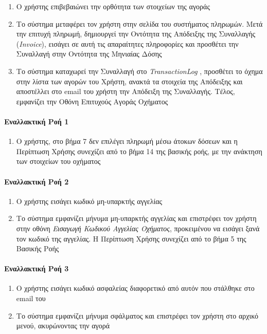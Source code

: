 \documentclass{../ol-softwaremanual}
\begin{document}
\begin{enumerate}
		\item Ο χρήστης επιβεβαιώνει την ορθότητα των στοιχείων της αγοράς		
		\item Το σύστημα μεταφέρει τον χρήστη στην σελίδα του συστήματος πληρωμών. Μετά την επιτυχή πληρωμή, δημιουργεί την Οντότητα της Απόδειξης της Συναλλαγής (\en \textit{Invoice}\gr), εισάγει σε αυτή τις απαραίτητες πληροφορίες και προσθέτει την Συναλλαγή στην Οντότητα της Μηνιαίας Δόσης
		\item Το σύστημα καταχωρεί την Συναλλαγή στο \en \textit{TransactionLog} \gr, προσθέτει το όχημα στην λίστα των αγορών του Χρήστη, ανακτά τα στοιχεία της Απόδειξης και αποστέλλει στο \en email \gr του χρήστη την Απόδειξη της Συναλλαγής. Τέλος, εμφανίζει την Οθόνη Επιτυχούς Αγοράς Οχήματος
	\end{enumerate}
	
	\paragraph{Εναλλακτική Ροή 1}
	\begin{enumerate}
		\item Ο χρήστης, στο βήμα 7 δεν επιλέγει πληρωμή μέσω άτοκων δόσεων και η Περίπτωση Χρήσης συνεχίζει από το βήμα 14 της βασικής ροής, με την ανάκτηση των στοιχείων του οχήματος
	\end{enumerate}
	
	\paragraph{Εναλλακτική Ροή 2}
	\begin{enumerate}
		\item Ο χρήστης εισάγει κωδικό μη-υπαρκτής αγγελίας
		\item Το σύστημα εμφανίζει μήνυμα μη-υπαρκτής αγγελίας και επιστρέφει τον χρήστη στην οθόνη \textit{Εισαγωγή Κωδικού Αγγελίας Οχήματος}, προκειμένου να εισάγει ξανά τον κωδικό της αγγελίας. Η Περίπτωση Χρήσης συνεχίζει από το βήμα 5 της Βασικής Ροής
	\end{enumerate}
	
	\paragraph{Εναλλακτική Ροή 3}
	\begin{enumerate}
		\item Ο χρήστης εισάγει κωδικό ασφαλείας διαφορετικό από αυτόν που στάλθηκε στο \en email \gr του
		\item Το σύστημα εμφανίζει μήνυμα σφάλματος και επιστρέφει τον χρήστη στο αρχικό μενού, ακυρώνοντας την αγορά
	\end{enumerate}
	
\end{document}
